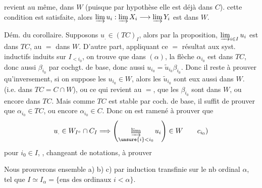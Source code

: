revient au même, dans $W$ (puisque par hypothèse elle est déjà dans $C$).  cette condition est satisfaite, alors $\varinjlim u_i:\varinjlim X_i\longrightarrow\varinjlim Y_i$ est dans $W$.

Dém. du corollaire. Supposons $u_.\in(TC)_I$, alors par la proposition, $\varinjlim_{i\in I}u_i$ est dans $TC$,   au $=$ dans $W$. D'autre part, appliquant ce $=$ résultat aux syst. inductifs induits sur $I_{<i_0}$, on trouve que dans $(\alpha)$, la \deleted{\unsure{$\beta$}} flèche  $\alpha_{i_0}$ est dans $TC$, donc aussi $\beta_{i_0}$ par cochgt. de base, donc aussi $u_{i_0}=\widetilde{u}_{i_0}\beta_{i_0}$.  Donc il reste à prouver qu'inversement, si on suppose les $u_{i_0}\in W$, alors les $\widetilde{u}_{i_0}$ sont eux aussi dans $W$. (i.e. dans $TC=C\cap W$), ou ce qui revient au $=$, que les $\beta_{i_0}$ sont dans $W$, ou encore dans $TC$. Mais comme $TC$ est stable par coch. de base, il suffit  de prouver que $\alpha_{i_0}\in TC$, ou encore $\alpha_{i_0}\in C$. Donc on est ramené à prouver que 
\[
 u_.\in W_{I^\circ}\cap C_I\Longrightarrow \left(\varinjlim_{\unsure{i}<i_0}u_i\right)\in W \tag*{$c_{i_0})$}
\]
pour  $i_0\in I$, , changeant de notations, à prouver

Nous prouverons ensemble a) b) c) par induction transfinie sur le nb ordinal $\alpha$, tel que $I\simeq I_\alpha=\{\text{ens des ordinaux }i<\alpha\}$.

